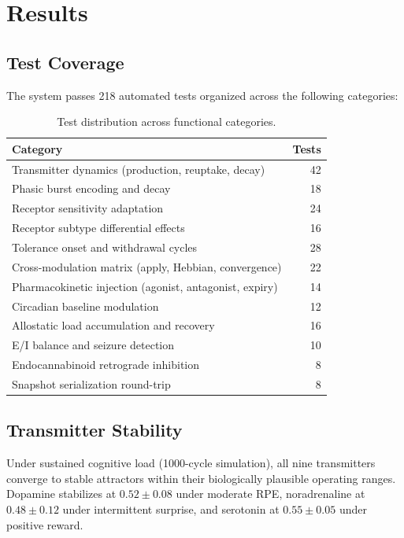\documentclass[11pt,a4paper]{article}
\begin{document}
\section{Results}

\subsection{Test Coverage}

The system passes 218 automated tests organized across the following categories:

\begin{table}[h]
\centering
\caption{Test distribution across functional categories.}
\label{tab:tests}
\begin{tabular}{lr}
\toprule
\textbf{Category} & \textbf{Tests} \\
\midrule
Transmitter dynamics (production, reuptake, decay) & 42 \\
Phasic burst encoding and decay & 18 \\
Receptor sensitivity adaptation & 24 \\
Receptor subtype differential effects & 16 \\
Tolerance onset and withdrawal cycles & 28 \\
Cross-modulation matrix (apply, Hebbian, convergence) & 22 \\
Pharmacokinetic injection (agonist, antagonist, expiry) & 14 \\
Circadian baseline modulation & 12 \\
Allostatic load accumulation and recovery & 16 \\
E/I balance and seizure detection & 10 \\
Endocannabinoid retrograde inhibition & 8 \\
Snapshot serialization round-trip & 8 \\
\bottomrule
\end{tabular}
\end{table}

\subsection{Transmitter Stability}

Under sustained cognitive load (1000-cycle simulation), all nine transmitters converge to stable attractors within their biologically plausible operating ranges. Dopamine stabilizes at $0.52 \pm 0.08$ under moderate RPE, noradrenaline at $0.48 \pm 0.12$ under intermittent surprise, and serotonin at $0.55 \pm 0.05$ under positive reward.
\end{document}
